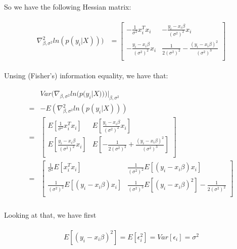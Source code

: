 \documentclass{article}
\begin{document}
So we have the following Hessian matrix:

\begin{align}
\begin{aligned}
\nabla_{\beta,\sigma^2}^2ln(p(y_i|X))) &=
\begin{bmatrix}
- \frac{1}{\sigma^2}x^T_ix_i			& - \frac{y_i - x_i \beta}{(\sigma^2)^2}x_i				\\
- \frac{y_i - x_i \beta}{(\sigma^2)^2}x_i	& \frac{1}{2(\sigma^2)^2} - \frac{(y_i - x_i \beta)^2}{(\sigma^2)^3}	\\
\end{bmatrix}
\end{aligned}
\end{align}

Unsing (Fisher's) information equality, we have that:

\begin{align}
\begin{aligned}
&Var(\nabla_{\beta,\sigma^2}ln(p(y_i|X)))|_{\beta, \sigma^2}\\
=&-E(\nabla_{\beta,\sigma^2}^2ln(p(y_i|X)))\\
=&
\begin{bmatrix}
E\left[ \frac{1}{\sigma^2}x^T_ix_i\right]			& E\left[ \frac{y_i - x_i \beta}{(\sigma^2)^2}x_i\right]				\\
E\left[ \frac{y_i - x_i \beta}{(\sigma^2)^2}x_i\right]	& E\left[ - \frac{1}{2(\sigma^2)^2} + \frac{(y_i - x_i \beta)^2}{(\sigma^2)^3}\right]	\\
\end{bmatrix}\\
=&
\begin{bmatrix}
\frac{1}{\sigma^2}E\left[x^T_ix_i\right]			&  \frac{1}{(\sigma^2)^2}E\left[(y_i - x_i \beta)x_i\right]				\\
 \frac{1}{(\sigma^2)^2}E\left[(y_i - x_i \beta)x_i\right]	& \frac{1}{(\sigma^2)^3}E\left[(y_i - x_i \beta)^2\right] -  \frac{1}{2(\sigma^2)^2}	\\
\end{bmatrix}\\
\end{aligned}
\end{align}

Looking at that, we have first

\begin{align}
\begin{aligned}
E\left[(y_i - x_i\beta)^2\right] = E\left[\epsilon_i^2\right] = Var\left[\epsilon_i\right] = \sigma^2
\end{aligned}
\end{align}
\end{document}
